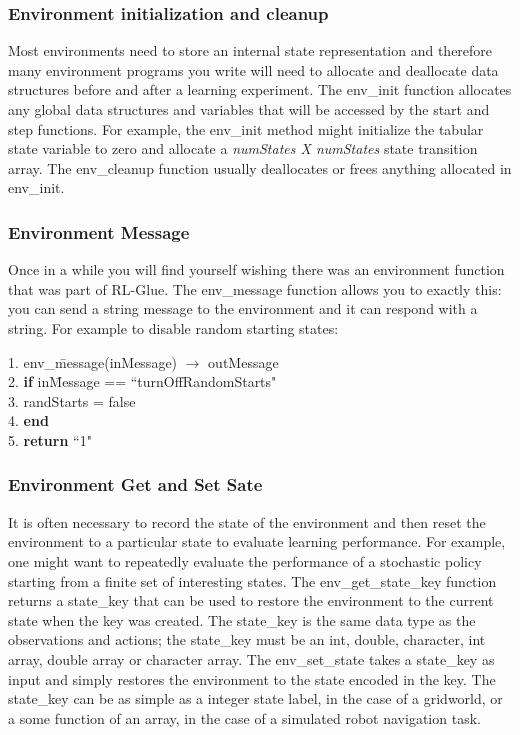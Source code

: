 \documentclass[11pt]{article}
\begin{document}
        
\subsubsection{Environment initialization and cleanup}        
Most environments need to store an internal state representation  and therefore many environment programs you write will need to allocate and deallocate data structures before and after a learning experiment. The env\_init function allocates any global data structures and variables that will be accessed by the start and step functions. For example, the env\_init method might initialize the tabular state variable to zero and allocate a {\it numStates X numStates} state transition array. The env\_cleanup function usually deallocates or frees anything allocated in env\_init.

\subsubsection{Environment Message}
Once in a while you will find yourself wishing there was an environment function that was part of RL-Glue. The env\_message function allows you to exactly this: you can send a string message to the environment and it can respond with a string. For example to disable random starting states:
\begin{tabbing}
1. env\_\=message(inMessage) $\rightarrow$ outMessage\\
2.\> {\bf if} in\=Message == ``turnOffRandomStarts"  \\
3. \>\> randStarts = false\\
4. \> {\bf end} \\
5. {\bf return} ``1"
\end{tabbing}

\subsubsection{Environment Get and Set Sate}
It is often necessary to record the state of the environment and then reset the environment to a particular state to evaluate learning performance. For example, one might want to repeatedly evaluate the performance of a stochastic policy starting from a finite set of interesting states. The env\_get\_state\_key function returns a state\_key that can be used to restore the environment to the current state when the key was created. The state\_key is the same data type as the observations and actions; the state\_key must be an int, double, character, int array, double array or character array. The env\_set\_state takes a state\_key as input and simply restores the environment to the state encoded in the key. The state\_key can be as simple as a integer state label, in the case of a gridworld, or a some function of an array, in the case of a simulated robot navigation task. 
\end{document}
